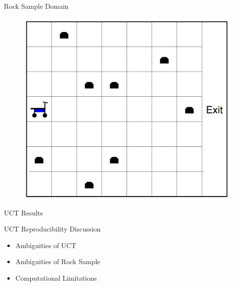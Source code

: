 \documentclass{beamer}
\begin{document}
\begin{frame}{Rock Sample Domain}

\begin{figure}
\includegraphics[page=1,height=.55\textheight,width=.5\textwidth]{rock_sample_domain.png}
\end{figure}


\end{frame}

\begin{frame}{UCT Results}
\begin{figure}[h]
\centering
{}
\hspace{1mm}
\end{figure}
\end{frame}

\begin{frame}{UCT Reproducibility Discussion}
\begin{itemize}
\item Ambiguities of UCT
\item Ambiguities of Rock Sample
\item Computational Limitations
\end{itemize}
\end{frame}
\end{document}
